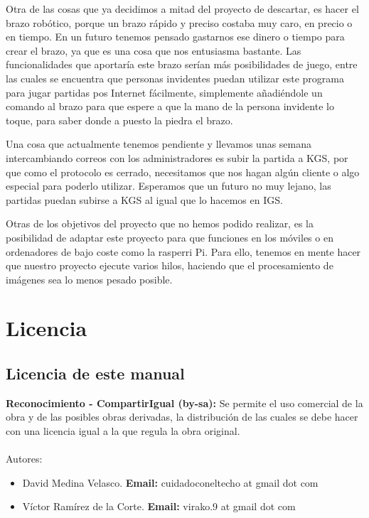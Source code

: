 \documentclass[12pt,a4paper]{report}
\begin{document}
Otra de las cosas que ya decidimos a mitad del proyecto de descartar, es hacer
el brazo robótico, porque un brazo rápido y preciso costaba muy caro, en precio
o en tiempo. En un futuro tenemos pensado gastarnos ese dinero o tiempo para
crear el brazo, ya que es una cosa que nos entusiasma bastante. Las
funcionalidades que aportaría este brazo serían más posibilidades de juego,
entre las cuales se encuentra que personas invidentes puedan utilizar este
programa para jugar partidas pos Internet fácilmente, simplemente añadiéndole un
comando al brazo para que espere a que la mano de la persona invidente lo toque,
para saber donde a puesto la piedra el brazo. 

Una cosa que actualmente tenemos pendiente y llevamos unas semana intercambiando
correos con los administradores es subir la partida a KGS, por que como el
protocolo es cerrado, necesitamos que nos hagan algún cliente o algo especial
para poderlo utilizar. Esperamos que un futuro no muy lejano, las partidas
puedan subirse a KGS al igual que lo hacemos en IGS. 

Otras de los objetivos del proyecto que no hemos podido realizar, es la
posibilidad de adaptar este proyecto para que funciones en los móviles o en
ordenadores de bajo coste como la rasperri Pi. Para ello, tenemos en mente hacer
que nuestro proyecto ejecute varios hilos, haciendo que el procesamiento de
imágenes sea lo menos pesado posible.


\chapter{Licencia}

\section{Licencia de este manual}

\textbf{Reconocimiento - CompartirIgual (by-sa):} Se permite el uso comercial de
la obra y de las posibles obras derivadas, la distribución de las cuales se debe
hacer con una licencia igual a la que regula la obra original. \\ \\


Autores: 
\begin{itemize} 
    \item David Medina Velasco. \textbf{Email:} cuidadoconeltecho at gmail dot
    com 
    \item Víctor Ramírez de la Corte. \textbf{Email:} virako.9 at gmail dot com 
\end{itemize}
\end{document}
